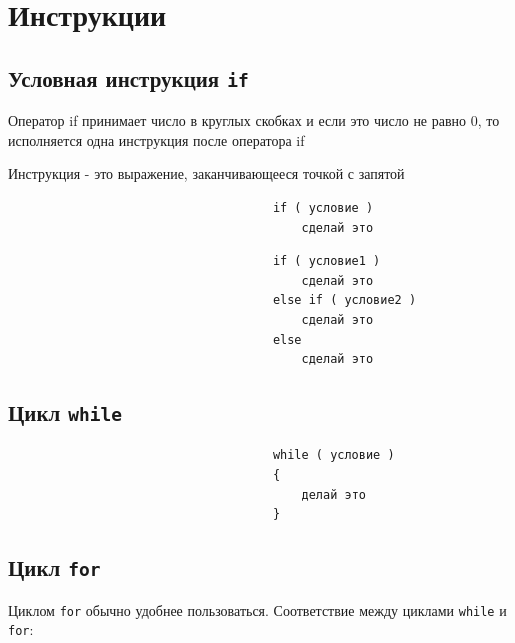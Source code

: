 \documentclass{article}
\begin{document}
\newpage

\section*{Инструкции}
\subsection*{Условная инструкция \texttt{if}}
Оператор if принимает число в круглых скобках и если это число не равно 0,
то исполняется одна инструкция после оператора if

Инструкция - это выражение, заканчивающееся точкой с запятой

\begin{center}
\begin{lstlisting}
                                     if ( условие )
                                         сделай это
\end{lstlisting}
\end{center}


\begin{center}
\begin{lstlisting}
                                     if ( условие1 )
                                         сделай это
                                     else if ( условие2 )
                                     	 сделай это
                                     else
                                         сделай это
\end{lstlisting}
\end{center}



\subsection*{Цикл \texttt{while}}
\begin{lstlisting}
                                     while ( условие )
                                     {
                                         делай это
                                     }
\end{lstlisting}

\subsection*{Цикл \texttt{for}}
Циклом \texttt{for} обычно удобнее пользоваться. Соответствие между циклами \texttt{while} и \texttt{for}: \\
\end{document}
